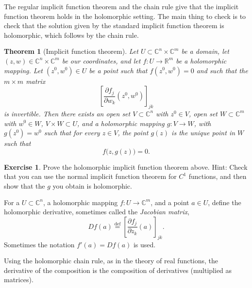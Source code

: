 \documentclass[12pt,openany]{book}
\newcommand{\C}{{\mathbb{C}}}
\newcommand{\R}{{\mathbb{R}}}
\newcommand{\myindex}[1]{#1\index{#1}}
\theoremstyle{plain}
\newtheorem{thm}{Theorem}[section]
\theoremstyle{remark}
\theoremstyle{definition}
\newenvironment{exbox}{%
    \def\FrameCommand{\vrule width 1pt \relax\hspace {10pt}}%
    \MakeFramed {\advance \hsize -\width \FrameRestore }%
}{%
    \endMakeFramed
}
\theoremstyle{exercise}
\newtheorem{exercise}{Exercise}[section]
\theoremstyle{example}
\begin{document}
The regular implicit function theorem and the chain rule
give that the implicit function theorem holds in the holomorphic setting.
The main thing to check is to check that the solution given by the
standard implicit function theorem is holomorphic, which follows by the
chain rule.

\begin{thm}[Implicit function theorem] \label{thm:ift}
Let $U \subset \C^{n} \times \C^{m}$ be a domain, let  $(z,w) \in \C^n \times
\C^m$ be our coordinates, and let $f \colon U \to \R^m$
be a holomorphic mapping.  Let $(z^0,w^0) \in U$ be a point such that
$f(z^0,w^0) = 0$ and such that the $m \times m$ matrix
\begin{equation*}
\left[
\frac{\partial f_j}{\partial w_k} (z^0,w^0)
\right]_{jk}
\end{equation*}
is invertible.
Then there exists an
open set $V \subset \C^n$ with $z^0 \in V$,
open set $W \subset \C^m$ with $w^0 \in W$,
$V \times W \subset U$,
and
a holomorphic
mapping $g \colon V \to W$, with $g(z^0) = w^0$
such that
for every $z \in V$, the point $g(z)$ is the unique point in $W$
such that
\begin{equation*}
f\bigl(z,g(z)\bigr) = 0 .
\end{equation*}
\end{thm}

\begin{exbox}
\begin{exercise}
Prove the holomorphic implicit function theorem above.
Hint: Check that you can use the normal implicit function theorem for $C^1$
functions, and then show that the $g$ you obtain is holomorphic.
\end{exercise}
\end{exbox}

For a $U \subset \C^n$, a holomorphic mapping $f \colon U \to \C^m$,
and a point $a \in U$,
define the holomorphic derivative, sometimes called the
\emph{\myindex{Jacobian matrix}},
\begin{equation*}
Df(a)
\overset{\text{def}}{=}
\left[
\frac{\partial f_j}{\partial z_k} (a)
\right]_{jk} .
\end{equation*}
Sometimes the notation $f'(a) = Df(a)$ is used.

Using the holomorphic chain rule, as in the theory of real functions,
the derivative of the composition is the composition of derivatives
(multiplied as matrices).
\end{document}
